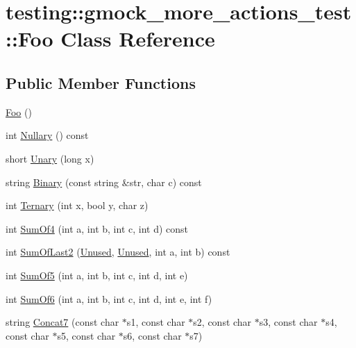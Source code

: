 \hypertarget{classtesting_1_1gmock__more__actions__test_1_1_foo}{}\section{testing\+:\+:gmock\+\_\+more\+\_\+actions\+\_\+test\+:\+:Foo Class Reference}
\label{classtesting_1_1gmock__more__actions__test_1_1_foo}
\subsection*{Public Member Functions}
\begin{DoxyCompactItemize}
\item 
\hyperlink{classtesting_1_1gmock__more__actions__test_1_1_foo_ad2603a65b94e019c75f4227787b9177e}{Foo} ()
\item 
int \hyperlink{classtesting_1_1gmock__more__actions__test_1_1_foo_ad6ba38dbb9b1594ac178630f07c4baa5}{Nullary} () const
\item 
short \hyperlink{classtesting_1_1gmock__more__actions__test_1_1_foo_a68d2b46d6cc7d51979b0254940af6090}{Unary} (long x)
\item 
string \hyperlink{classtesting_1_1gmock__more__actions__test_1_1_foo_a15d8082ba501899c8ac1d93543ed9ad3}{Binary} (const string \&str, char c) const
\item 
int \hyperlink{classtesting_1_1gmock__more__actions__test_1_1_foo_afc5b86988210ad598fa3a2a9822297e4}{Ternary} (int x, bool y, char z)
\item 
int \hyperlink{classtesting_1_1gmock__more__actions__test_1_1_foo_a69ca68e84528904032bad9533a23fb0a}{Sum\+Of4} (int a, int b, int c, int d) const
\item 
int \hyperlink{classtesting_1_1gmock__more__actions__test_1_1_foo_abc041eb7a8e8211656495f2540f315ec}{Sum\+Of\+Last2} (\hyperlink{namespacetesting_a603e329ec0263ebfcf16f712810bd511}{Unused}, \hyperlink{namespacetesting_a603e329ec0263ebfcf16f712810bd511}{Unused}, int a, int b) const
\item 
int \hyperlink{classtesting_1_1gmock__more__actions__test_1_1_foo_a55fb0cdc224c450f401e0fea4f979512}{Sum\+Of5} (int a, int b, int c, int d, int e)
\item 
int \hyperlink{classtesting_1_1gmock__more__actions__test_1_1_foo_a34b5ae7cd4620331af92c637e3534bc4}{Sum\+Of6} (int a, int b, int c, int d, int e, int f)
\item 
string \hyperlink{classtesting_1_1gmock__more__actions__test_1_1_foo_a267eab73377069cdd153f351e577ec01}{Concat7} (const char $\ast$s1, const char $\ast$s2, const char $\ast$s3, const char $\ast$s4, const char $\ast$s5, const char $\ast$s6, const char $\ast$s7)

\end{DoxyCompactItemize}
